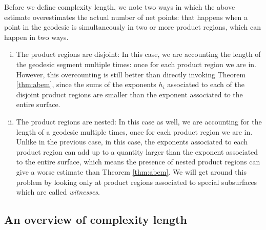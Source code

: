 \documentclass[12pt, reqno]{amsart}
\begin{document}
Before we define complexity length, we note two ways in which the above estimate overestimates the actual number of net points: that happens when a point in the geodesic is simultaneously in two or more product regions, which can happen in two ways.
\begin{enumerate}[(i)]
\item The product regions are disjoint: In this case, we are accounting the length of the geodesic segment multiple times: once for each product region we are in. However, this overcounting is still better than directly invoking Theorem \ref{thm:abem}, since the sums of the exponents $h_i$ associated to each of the disjoint product regions are smaller than the exponent associated to the entire surface.
\item The product regions are nested: In this case as well, we are accounting for the length of a geodesic multiple times, once for each product region we are in.
  Unlike in the previous case, in this case, the exponents associated to each product region can add up to a quantity larger than the exponent associated to the entire surface, which means the presence of nested product regions can give a worse estimate than Theorem \ref{thm:abem}.
  We will get around this problem by looking only at product regions associated to special subsurfaces which are called \emph{witnesses}.
\end{enumerate}




\subsection{An overview of complexity length}
\label{sec:an-overv-compl}
\end{document}
